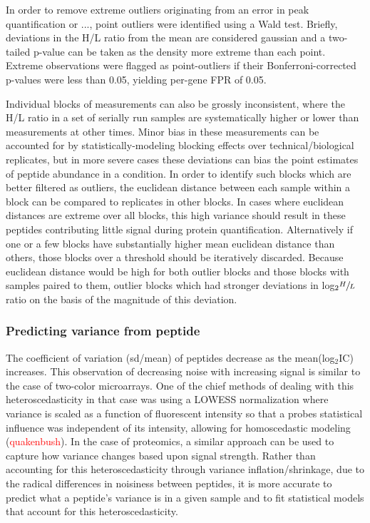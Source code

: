 \documentclass[12pt]{article}
\begin{document}
In order to remove extreme outliers originating from an error in peak quantification or ..., point outliers were identified using a Wald test.  Briefly, deviations in the H/L ratio from the mean are considered gaussian and a two-tailed p-value can be taken as the density more extreme than each point.  Extreme observations were flagged as point-outliers if their Bonferroni-corrected p-values were less than 0.05, yielding per-gene FPR of 0.05.

Individual blocks of measurements can also be grossly inconsistent, where the H/L ratio in a set of serially run samples are systematically higher or lower than measurements at other times.  Minor bias in these measurements can be accounted for by statistically-modeling blocking effects over technical/biological replicates, but in more severe cases these deviations can bias the point estimates of peptide abundance in a condition.  In order to identify such blocks which are better filtered as outliers, the euclidean distance between each sample within a block can be compared to replicates in other blocks.  In cases where euclidean distances are extreme over all blocks, this high variance should  result in these peptides contributing little signal during protein quantification.  Alternatively if one or a few blocks have substantially higher mean euclidean distance than others, those blocks over a threshold should be iteratively discarded.  Because euclidean distance would be high for both outlier blocks and those blocks with samples paired to them, outlier blocks which had stronger deviations in log$_{2}\sfrac{H}{L}$ ratio on the basis of the magnitude of this deviation.

\subsubsection*{Predicting variance from peptide }

The coefficient of variation (sd/mean) of peptides decrease as the mean(log$_{2}$IC) increases.  This observation of decreasing noise with increasing signal is similar to the case of two-color microarrays.  One of the chief methods of dealing with this heteroscedasticity in that case was using a LOWESS normalization where variance is scaled as a function of fluorescent intensity so that a probes statistical influence was independent of its intensity, allowing for homoscedastic modeling (\textcolor{red}{quakenbush}).  In the case of proteomics, a similar approach can be used to capture how variance changes based upon signal strength.  Rather than accounting for this heteroscedasticity through variance inflation/shrinkage, due to the radical differences in noisiness between peptides, it is more accurate to predict what a peptide's variance is in a given sample and to fit statistical models that account for this heteroscedasticity.
\end{document}
